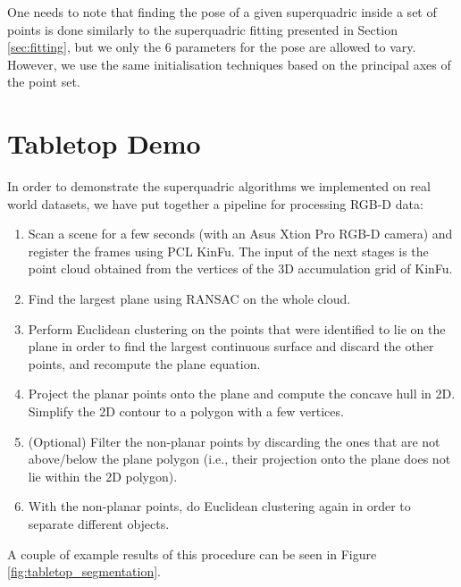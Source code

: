 \documentclass{article}
\begin{document}
One needs to note that finding the pose of a given superquadric inside a set of points is done similarly to the superquadric fitting presented in Section \ref{sec:fitting}, but we only the 6 parameters for the pose are allowed to vary. However, we use the same initialisation techniques based on the principal axes of the point set.

\section {Tabletop Demo}
\label{sec:tabletop_demo} 

In order to demonstrate the superquadric algorithms we implemented on real world datasets, we have put together a pipeline for processing RGB-D data:

\begin{enumerate}
\item {Scan a scene for a few seconds (with an Asus Xtion Pro RGB-D camera) and register the frames using PCL KinFu. The input of the next stages is the point cloud obtained from the vertices of the 3D accumulation grid of KinFu.}
\item {Find the largest plane using RANSAC on the whole cloud.}
\item {Perform Euclidean clustering on the points that were identified to lie on the plane in order to find the largest continuous surface and discard the other points, and recompute the plane equation.}
\item {Project the planar points onto the plane and compute the concave hull in 2D. Simplify the 2D contour to a polygon with a few vertices.}
\item {(Optional) Filter the non-planar points by discarding the ones that are not above/below the plane polygon (i.e., their projection onto the plane does not lie within the 2D polygon).}
\item {With the non-planar points, do Euclidean clustering again in order to separate different objects.}
\end{enumerate}

A couple of example results of this procedure can be seen in Figure \ref{fig:tabletop_segmentation}.
\end{document}
